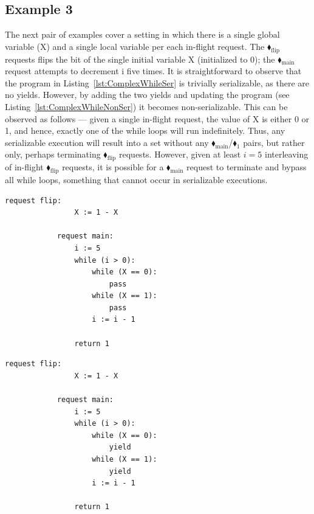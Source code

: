 \subsection{Example 3}

The next pair of examples cover a setting in which there is a single global variable (X) and a single local variable per each in-flight request. The {\color{ForestGreen}$\blacklozenge_\text{flip}$} requests flips the bit of the single initial variable X (initialized to 0); the {\color{ForestGreen}$\blacklozenge_\text{main}$} request attempts to decrement i five times.
%
It is straightforward to observe that the program in Listing~\ref{lst:ComplexWhileSer} is trivially serializable, as there are no yields.
%
However, by adding the two yields and updating the program (see Listing~\ref{lst:ComplexWhileNonSer}) it becomes non-serializable. This can be observed as follows --- given a single in-flight request, the value of X is either 0 or 1, and hence, exactly one of the while loops will run indefinitely. Thus, any serializable execution will result into a set without any {\color{ForestGreen}$\blacklozenge_\text{main}$}/{\color{red}$\blacklozenge_1$} pairs, but rather only, perhaps terminating {\color{ForestGreen}$\blacklozenge_\text{flip}$} requests.
%
However, given at least $i=5$ interleaving of in-flight {\color{ForestGreen}$\blacklozenge_\text{flip}$} requests, it is possible for a {\color{ForestGreen}$\blacklozenge_\text{main}$} request to terminate and bypass all while loops, something that cannot occur in serializable executions.


\noindent
\begin{minipage}[t]{0.45\textwidth}
	\begin{lstlisting}[caption={Complex while (serializable)},
		label={lst:ComplexWhileSer}]
		    request flip: 
		        X := 1 - X 
		    
		    request main:
		        i := 5
		        while (i > 0):
		            while (X == 0):
		                pass
		            while (X == 1):
		                pass
		            i := i - 1
		        
		        return 1       
				\end{lstlisting}
\end{minipage}%
\hfill
\begin{minipage}[t]{0.45\textwidth}
	\begin{lstlisting}[caption={Complex while with yields (not serializable)},
		label={lst:ComplexWhileNonSer}]
		    request flip: 
		        X := 1 - X 
		
		    request main:
		        i := 5
		        while (i > 0):
		            while (X == 0):
		                yield
		            while (X == 1):
		                yield
		            i := i - 1
		
		        return 1        
					\end{lstlisting}
\end{minipage}
	
